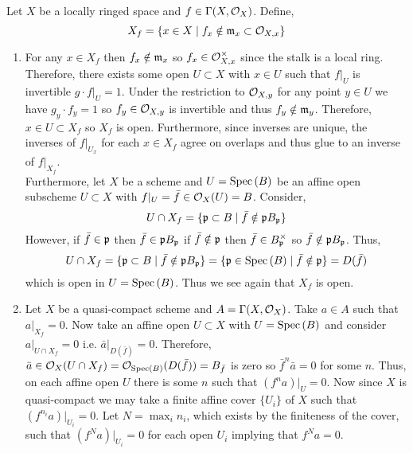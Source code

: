 \documentclass[12pt]{article}
\begin{document}
Let $X$ be a locally ringed space and $f \in \Gamma(X, \mathcal{O}_{X})$. Define,
\[ X_f = \{ x \in X \mid f_x \notin \mathfrak{m}_x \subset \mathcal{O}_{X, x} \} \]
\begin{enumerate}
\item For any $x \in X_f$ then $f_x \notin \mathfrak{m}_x$ so $f_x \in \mathcal{O}_{X, x}^\times$ since the stalk is a local ring. Therefore, there exists some open $U  \subset X$ with $x \in U$ such that $f|_U$ is invertible $g \cdot f|_U = 1$. Under the restriction to $\mathcal{O}_{X, y}$ for any point $y \in U$ we have $g_y \cdot f_y = 1$ so $f_y \in \mathcal{O}_{X, y}$ is invertible and thus $f_y \notin \mathfrak{m}_y$. Therefore, $x \in U \subset X_f$ so $X_f$ is open. Furthermore, since inverses are unique, the inverses of $f|_{U_x}$ for each $x \in X_f$ agree on overlaps and thus glue to an inverse of $f|_{X_f}$.
\bigskip\\
Furthermore, let $X$ be a scheme and $U = \mathrm{Spec}\left( B \right)$ be an affine open subscheme $U \subset X$ with $f|_U = \bar{f} \in \mathcal{O}_{X}(U) = B$. 
Consider,
\[ U \cap X_f = \{ \mathfrak{p} \subset B \mid \bar{f} \notin \mathfrak{p} B_{\mathfrak{p}} \} \]
However, if $\bar{f} \in \mathfrak{p}$ then $\bar{f} \in \mathfrak{p} B_{\mathfrak{p}}$ if $\bar{f} \notin \mathfrak{p}$ then $\bar{f} \in B_{\mathfrak{p}}^\times$ so $\bar{f} \notin \mathfrak{p} B_{\mathfrak{p}}$. Thus,
\[ U \cap X_f = \{ \mathfrak{p} \subset B \mid \bar{f} \notin \mathfrak{p} B_{\mathfrak{p}} \} = \{ \mathfrak{p} \in \mathrm{Spec}\left( B \right) \mid \bar{f} \notin \mathfrak{p} \} = D(\bar{f}) \]
which is open in $U = \mathrm{Spec}\left( B \right)$. Thus we see again that $X_f$ is open.

\item Let $X$ be a quasi-compact scheme and $A = \Gamma(X, \mathcal{O}_{X})$. Take $a \in A$ such that $a|_{X_f} = 0$. Now take an affine open $U \subset X$ with $U = \mathrm{Spec}\left( B \right)$ and consider $a |_{U \cap X_f} = 0$ i.e. $\bar{a} |_{D(\bar{f})} = 0$. Therefore, $\bar{a} \in \mathcal{O}_{X}(U \cap X_f) = \mathcal{O}_{\mathrm{Spec}\left( B \right)}(D(\bar{f})) = B_{\bar{f}}$ is zero so $\bar{f}^n \bar{a} = 0$ for some $n$. Thus, on each affine open $U$ there is some $n$ such that $(f^n a)|_U = 0$. Now since $X$ is quasi-compact we may take a finite affine cover $\{ U_i \}$ of $X$ such that $(f^{n_i} a)|_{U_i} = 0$. Let $N = \max_i n_i$, which exists by the finiteness of the cover, such that $(f^N a)|_{U_i} = 0$ for each open $U_i$ implying that $f^N a = 0$.  


\end{enumerate}
\end{document}
